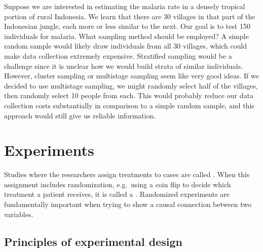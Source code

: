 \begin{example}{Suppose we are interested in estimating the malaria rate in a densely tropical portion of rural Indonesia. We learn that there are 30 villages in that part of the Indonesian jungle, each more or less similar to the next. Our goal is to test 150 individuals for malaria. What sampling method should be employed?}
A simple random sample would likely draw individuals from all 30 villages, which could make data collection extremely expensive. Stratified sampling would be a challenge since it is unclear how we would build strata of similar individuals. However, cluster sampling or multistage sampling seem like very good ideas. If we decided to use multistage sampling, we might randomly select half of the villages, then randomly select 10 people from each. This would probably reduce our data collection costs substantially in comparison to a simple random sample, and this approach would still give us reliable information.
\end{example}


\section[Experiments]{Experiments ~}
\label{experimentsSection}

Studies where the researchers assign treatments to cases are called . When this assignment includes randomization, e.g.~using a coin flip to decide which treatment a patient receives, it is called a . Randomized experiments are fundamentally important when trying to show a causal connection between two variables.

\subsection{Principles of experimental design}
\label{experimentalDesignPrinciples}


